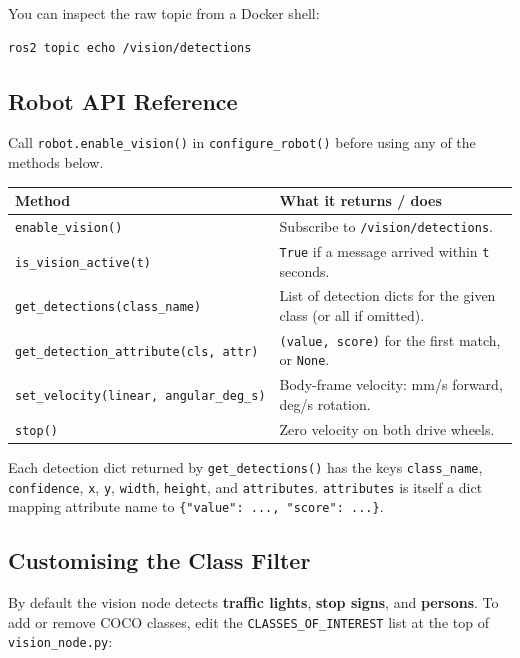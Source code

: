 \documentclass{ol-softwaremanual}
\begin{document}
\noindent You can inspect the raw topic from a Docker shell:

\begin{verbatim}
ros2 topic echo /vision/detections
\end{verbatim}

\subsection{Robot API Reference}
\label{sec:robot-api}

Call \texttt{robot.enable\_vision()} in \texttt{configure\_robot()} before using
any of the methods below.

\begin{center}
\begin{tabularx}{\linewidth}{lX}
\hline
\textbf{Method} & \textbf{What it returns / does} \\
\hline
\texttt{enable\_vision()} & Subscribe to \texttt{/vision/detections}. \\
\texttt{is\_vision\_active(t)} & \texttt{True} if a message arrived within \texttt{t} seconds. \\
\texttt{get\_detections(class\_name)} & List of detection dicts for the given class (or all if omitted). \\
\texttt{get\_detection\_attribute(cls,~attr)} & \texttt{(value, score)} for the first match, or \texttt{None}. \\
\texttt{set\_velocity(linear,~angular\_deg\_s)} & Body-frame velocity: mm/s forward, deg/s rotation. \\
\texttt{stop()} & Zero velocity on both drive wheels. \\
\hline
\end{tabularx}
\end{center}

Each detection dict returned by \texttt{get\_detections()} has the keys
\texttt{class\_name}, \texttt{confidence}, \texttt{x}, \texttt{y},
\texttt{width}, \texttt{height}, and \texttt{attributes}.
\texttt{attributes} is itself a dict mapping attribute name to
\texttt{\{"value": ..., "score": ...\}}.

\subsection{Customising the Class Filter}

By default the vision node detects \textbf{traffic lights}, \textbf{stop signs},
and \textbf{persons}.
To add or remove COCO classes, edit the \texttt{CLASSES\_OF\_INTEREST} list at
the top of \texttt{vision\_node.py}:
\end{document}
